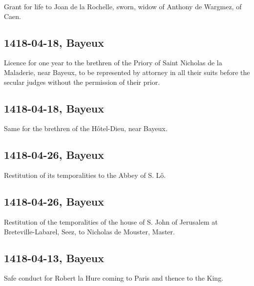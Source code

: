 \documentclass[a4paper,12pt,twoside]{book}
\begin{document}
                
                     Grant for life to Joan de la Rochelle, sworn, widow of Anthony de Wargmez, of Caen.
                  
                
                \subsection{1418-04-18, Bayeux}
                
                
                     Licence for one year to the brethren of the Priory of Saint Nicholas de la Maladerie, near Bayeux, to be represented by attorney in all their suits before the secular judges without the permission of their prior.
                  
                
                \subsection{1418-04-18, Bayeux}
                
                
                     Same for the brethren of the Hôtel-Dieu, near Bayeux.
                  
                
                \subsection{1418-04-26, Bayeux}
                
                
                     Restitution of its temporalities to the Abbey of S. Lô.
                  
                
                \subsection{1418-04-26, Bayeux}
                
                
                     Restitution of the temporalities of the house of S. John of Jerusalem at Breteville-Labarel, Seez, to Nicholas de Mouster, Master.
                  
                
                \subsection{1418-04-13, Bayeux}
                
                
                     Safe conduct for Robert la Hure coming to Paris and thence to the King.
                  
\end{document}
